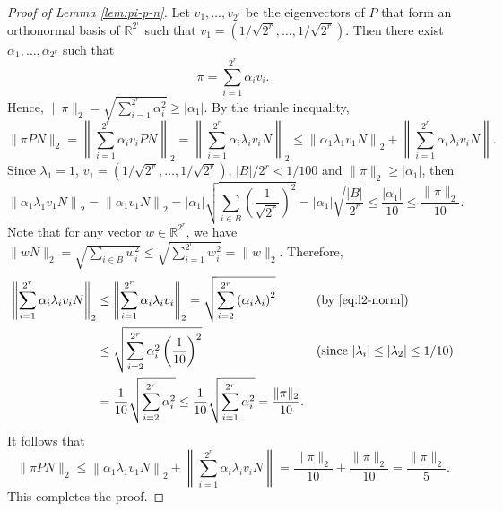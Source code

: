 \documentclass[letterpaper, reqno,11pt]{article}
\newcommand{\RR}{\mathbb{R}}
\begin{document}
\begin{proof}[Proof of Lemma \ref{lem:pi-p-n}]
  Let $v_1, \ldots, v_{2^r}$ be the eigenvectors of $P$ that form an orthonormal basis of $\RR^{2^r}$ such that $v_1 = (1/\sqrt{2^r}, \ldots, 1/\sqrt{2^r})$. Then there exist $\alpha_1, \ldots, \alpha_{2^r}$ such that
  $$ \pi = \sum_{i = 1}^{2^r} \alpha_i v_i. $$
  Hence, $\| \pi \|_2 = \sqrt{\sum_{i = 1}^{2^r} \alpha_i^2} \geq |\alpha_1|$. By the trianle inequality,
  $$ \| \pi PN \|_2 = \left\| \sum_{i = 1}^{2^r} \alpha_i v_i PN \right\|_2 = \left\| \sum_{i = 1}^{2^r} \alpha_i \lambda_i v_i N \right\|_2 \leq \left\| \alpha_1 \lambda_1 v_1 N \right\|_2 + \left\| \sum_{i = 1}^{2^r} \alpha_i \lambda_i v_i N \right\|. $$
  Since $\lambda_1 = 1$, $v_1 = (1/\sqrt{2^r}, \ldots, 1/\sqrt{2^r})$, $|B|/2^r < 1/100$ and $\|\pi\|_2 \geq |\alpha_1|$, then
  $$ \left\| \alpha_1 \lambda_1 v_1 N \right\|_2 = \left\| \alpha_1 v_1 N \right\|_2 = \left|\alpha_1\right| \sqrt{\sum_{i \in B} \left(\frac{1}{\sqrt{2^r}}\right)^2} = \left|\alpha_1\right| \sqrt{\frac{|B|}{2^r}} \leq \frac{\left|\alpha_1\right|}{10} \leq \frac{\| \pi \|_2}{10}. $$
  Note that for any vector $w \in \RR^{2^r}$, we have $\| wN \|_2 = \sqrt{\sum_{i \in B} w_i^2} \leq \sqrt{\sum_{i = 1}^{2^r} w_i^2} = \| w \|_2$. Therefore,
  \begin{align*}
    \left\| \sum_{i = 1}^{2^r} \alpha_i \lambda_i v_i N \right\|_2 &\leq \left\| \sum_{i = 1}^{2^r} \alpha_i \lambda_i v_i \right\|_2 = \sqrt{\sum_{i = 2}^{2^r} \left(\alpha_i \lambda_i\right)^2} && \text{(by \eqref{eq:l2-norm})} \\
    &\leq \sqrt{\sum_{i = 2}^{2^r} \alpha_i^2 \left(\frac{1}{10}\right)^2} && \text{(since $|\lambda_i| \leq |\lambda_2| \leq 1/10$)} \\
    &= \frac{1}{10} \sqrt{\sum_{i = 2}^{2^r} \alpha_i^2} \leq \frac{1}{10} \sqrt{\sum_{i = 1}^{2^r} \alpha_i^2} = \frac{\| \pi \|_2}{10}.
  \end{align*}
  It follows that
  $$ \| \pi PN \|_2 \leq \left\| \alpha_1 \lambda_1 v_1 N \right\|_2 + \left\| \sum_{i = 1}^{2^r} \alpha_i \lambda_i v_i N \right\| = \frac{\| \pi \|_2}{10} + \frac{\| \pi \|_2}{10} = \frac{\| \pi \|_2}{5}. $$
  This completes the proof.
\end{proof}
\end{document}
